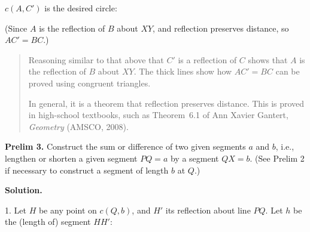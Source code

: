 \documentclass[11pt,a4paper]{article}
\newcommand*{\qed}{%
$\quad\quad$\raisebox{2pt}{\framebox[10pt]{\rule{0pt}{4pt}}}%
}
\begin{document}
$c(A,C')$ is the desired circle:

\begin{center}
\end{center}

(Since $A$ is the reflection of $B$ about $XY$, and reflection preserves distance, so $AC'=BC$.) \qed

\begin{quote}
Reasoning similar to that above that $C'$ is a reflection of $C$ shows that $A$ is the reflection of $B$ about $XY$. The thick lines show how $AC'=BC$ can be proved using congruent triangles.

In general, it is a theorem that reflection  preserves distance. This is proved in high-school textbooks, such as Theorem~6.1 of Ann Xavier Gantert, \textit{Geometry} (AMSCO, 2008).
\end{quote}


\textbf{Prelim 3.} Construct the sum or difference of two given segments $a$ and $b$, i.e., lengthen or shorten a given segment $PQ = a$ by a segment $QX = b$. (See Prelim 2 if necessary to construct a segment of length $b$ at $Q$.)

\textbf{Solution.}

1. Let $H$ be any point on $c(Q,b)$, and $H'$ its reflection about line $PQ$. Let $h$ be the (length of) segment $HH'$:
\end{document}
